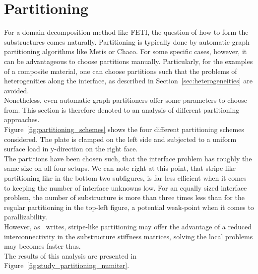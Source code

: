 \section{Partitioning}
For a domain decomposition method like FETI, the question of how to form the substructures comes naturally. Partitioning is typically done by automatic graph partitioning algorithms like Metis or Chaco. For some specific cases, however, it can be advantageous to choose partitions manually. Particularly, for the examples of a composite material, one can choose partitions such that the problems of heterogenities along the interface, as described in Section~\ref{sec:heterogeneities} are avoided.\\
Nonetheless, even automatic graph partitioners offer some parameters to choose from. This section is therefore denoted to an analysis of different partitioning approaches.
\\
Figure~\ref{fig:partitioning_schemes} shows the four different partitioning schemes considered. The plate is clamped on the left side and subjected to a uniform surface load in y-direction on the right face.
\\
The partitions have been chosen such, that the interface problem has roughly the same size on all four setups. We can note right at this point, that stripe-like partitioning like in the bottom two subfigures, is far less efficient when it comes to keeping the number of interface unknowns low. For an equally sized interface problem, the number of substructure is more than three times less than for the regular partitioning in the top-left figure, a potential weak-point when it comes to parallizability.\\
However, as~\cite{Farhat1991} writes, stripe-like partitioning may offer the advantage of a reduced interconnectivity in the substructure stiffness matrices, solving the local problems may becomes faster thus.
\\
The results of this analysis are presented in Figure~\ref{fig:study_partitioning_numiter}.



